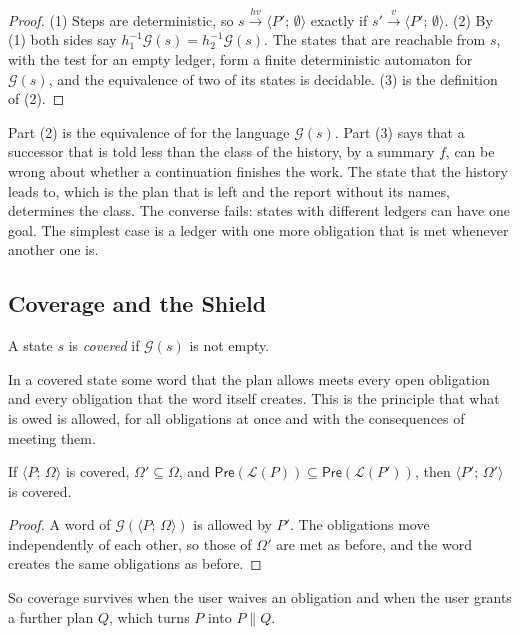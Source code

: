\documentclass[acmsmall,nonacm,screen]{acmart}
\newcommand{\kw}[1]{\mathsf{#1}}
\newcommand{\st}[2]{\langle #1;\, #2 \rangle}
\newcommand{\lang}[1]{\mathcal{L}(#1)}
\newcommand{\pre}[1]{\kw{Pre}(#1)}
\newcommand{\goal}[1]{\mathcal{G}(#1)}
\newcommand{\sh}{\mathbin{\parallel}}
\newcommand{\step}[1]{\xrightarrow{\,#1\,}}
\newcommand{\claim}[2]{#2}
\begin{document}
\begin{proof}
(1) Steps are deterministic, so $s \step{hv} \st{P'}{\emptyset}$ exactly if
$s' \step{v} \st{P'}{\emptyset}$. (2) By (1) both sides say $h_1^{-1}\goal{s} =
h_2^{-1}\goal{s}$. The states that are reachable from $s$, with the test for an empty
ledger, form a finite deterministic automaton for $\goal{s}$, and the equivalence of two of
its states is decidable. (3) is the definition of (2).
\end{proof}

Part (2) is the equivalence of \citet{nerode1958} for the language $\goal{s}$. Part (3) says
that a successor that is told less than the class of the history, by a summary $f$, can be
wrong about whether a continuation finishes the work. The state that the history leads to,
which is the plan that is left and the report without its names, determines the class.
\claim{different-ledgers}{The converse fails: states with different ledgers can have one
goal.} The simplest case is a ledger with one more obligation that is met whenever another
one is.

\subsection{Coverage and the Shield}

\begin{definition}[Covered]
A state $s$ is \emph{covered} if $\goal{s}$ is not empty.
\end{definition}

In a covered state some word that the plan allows meets every open obligation and every
obligation that the word itself creates. This is the principle that what is owed is allowed,
for all obligations at once and with the consequences of meeting them.

\begin{lemma}
\label{lem:mono}
If $\st{P}{\Omega}$ is covered, $\Omega' \subseteq \Omega$, and $\pre{\lang{P}} \subseteq
\pre{\lang{P'}}$, then $\st{P'}{\Omega'}$ is covered.
\end{lemma}

\begin{proof}
A word of $\goal{\st{P}{\Omega}}$ is allowed by $P'$. The obligations move independently of
each other, so those of $\Omega'$ are met as before, and the word creates the same
obligations as before.
\end{proof}

So coverage survives when the user waives an obligation and when the user grants a further
plan $Q$, which turns $P$ into $P \sh Q$.
\end{document}
